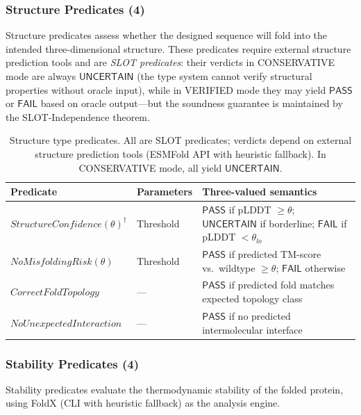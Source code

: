 \documentclass[acmsmall,review,anonymous]{acmart}
\newcommand{\PASS}{\ensuremath{\mathsf{PASS}}\xspace}
\newcommand{\FAIL}{\ensuremath{\mathsf{FAIL}}\xspace}
\newcommand{\UNCERTAIN}{\ensuremath{\mathsf{UNCERTAIN}}\xspace}
\begin{document}
\subsubsection{Structure Predicates (4)}

Structure predicates assess whether the designed sequence will fold
into the intended three-dimensional structure.
These predicates require external structure prediction tools and are
\emph{SLOT predicates}: their verdicts in CONSERVATIVE mode are always
\UNCERTAIN{} (the type system cannot verify structural properties
without oracle input), while in VERIFIED mode they may yield \PASS{}
or \FAIL{} based on oracle output---but the soundness guarantee is
maintained by the SLOT-Independence theorem.

\begin{table}[t]
\centering
\caption{Structure type predicates. All are SLOT predicates; verdicts
         depend on external structure prediction tools (ESMFold
         API with heuristic fallback). In CONSERVATIVE mode, all
         yield \UNCERTAIN.}
\label{tab:struct-predicates}
\begin{tabular}{llp{4.6cm}}
\toprule
\textbf{Predicate} & \textbf{Parameters} & \textbf{Three-valued semantics} \\
\midrule
$\mathit{StructureConfidence}(\theta)^\dagger$ & Threshold &
  \PASS{} if pLDDT $\ge \theta$; \UNCERTAIN{} if borderline;
  \FAIL{} if pLDDT $< \theta_{\mathit{lo}}$ \\
$\mathit{NoMisfoldingRisk}(\theta)$ & Threshold &
  \PASS{} if predicted TM-score vs.\ wildtype $\ge \theta$;
  \FAIL{} otherwise \\
$\mathit{CorrectFoldTopology}$ & --- &
  \PASS{} if predicted fold matches expected topology class \\
$\mathit{NoUnexpectedInteraction}$ & --- &
  \PASS{} if no predicted intermolecular interface \\
\bottomrule
\end{tabular}
\end{table}

\subsubsection{Stability Predicates (4)}

Stability predicates evaluate the thermodynamic stability of the folded
protein, using FoldX (CLI with heuristic fallback) as the analysis
engine.
\end{document}
